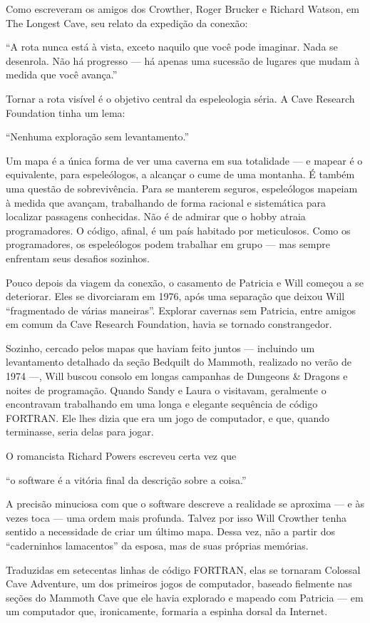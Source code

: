 \documentclass[12pt,a4paper]{article}
\begin{document}
Como escreveram os amigos dos Crowther, Roger Brucker e Richard Watson, em The Longest Cave, seu relato da expedição da conexão:

“A rota nunca está à vista, exceto naquilo que você pode imaginar.
Nada se desenrola. Não há progresso — há apenas uma sucessão de lugares que mudam à medida que você avança.”

Tornar a rota visível é o objetivo central da espeleologia séria.
A Cave Research Foundation tinha um lema:

“Nenhuma exploração sem levantamento.”

Um mapa é a única forma de ver uma caverna em sua totalidade — e mapear é o equivalente, para espeleólogos, a alcançar o cume de uma montanha.
É também uma questão de sobrevivência.
Para se manterem seguros, espeleólogos mapeiam à medida que avançam, trabalhando de forma racional e sistemática para localizar passagens conhecidas.
Não é de admirar que o hobby atraia programadores.
O código, afinal, é um país habitado por meticulosos.
Como os programadores, os espeleólogos podem trabalhar em grupo — mas sempre enfrentam seus desafios sozinhos.

Pouco depois da viagem da conexão, o casamento de Patricia e Will começou a se deteriorar.
Eles se divorciaram em 1976, após uma separação que deixou Will “fragmentado de várias maneiras”.
Explorar cavernas sem Patricia, entre amigos em comum da Cave Research Foundation, havia se tornado constrangedor.

Sozinho, cercado pelos mapas que haviam feito juntos — incluindo um levantamento detalhado da seção Bedquilt do Mammoth, realizado no verão de 1974 —, Will buscou consolo em longas campanhas de Dungeons & Dragons e noites de programação.
Quando Sandy e Laura o visitavam, geralmente o encontravam trabalhando em uma longa e elegante sequência de código FORTRAN.
Ele lhes dizia que era um jogo de computador, e que, quando terminasse, seria delas para jogar.

O romancista Richard Powers escreveu certa vez que

“o software é a vitória final da descrição sobre a coisa.”

A precisão minuciosa com que o software descreve a realidade se aproxima — e às vezes toca — uma ordem mais profunda.
Talvez por isso Will Crowther tenha sentido a necessidade de criar um último mapa.
Dessa vez, não a partir dos “caderninhos lamacentos” da esposa, mas de suas próprias memórias.

Traduzidas em setecentas linhas de código FORTRAN, elas se tornaram Colossal Cave Adventure,
um dos primeiros jogos de computador, baseado fielmente nas seções do Mammoth Cave que ele havia explorado e mapeado com Patricia —
em um computador que, ironicamente, formaria a espinha dorsal da Internet.
\end{document}
